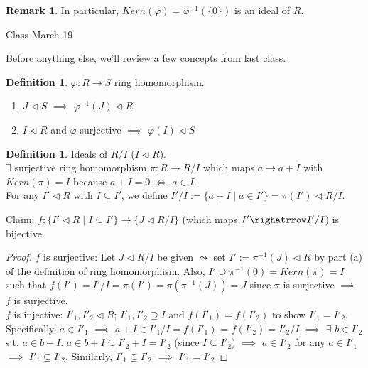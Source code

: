 \documentclass[11pt]{article}
\theoremstyle{definition}
\newtheorem{definition}[thm]{Definition}
\newtheorem{remark}[thm]{Remark}
\numberwithin{equation}{section}
\begin{document}
\begin{remark}
In particular, $Kern(\varphi) = \varphi^{-1}(\{0\})$ is an ideal of $R$.
\end{remark}

\begin{center}
{\sf\LARGE Class March 19}
\end{center}


Before anything else, we'll review a few concepts from last class.

\begin{definition}
$\varphi:R \rightarrow S$ ring homomorphism.
\begin{enumerate}
    \item $J \vartriangleleft S$ $\implies$ $\varphi^{-1}(J) \vartriangleleft R$
    \item $I \vartriangleleft R$ and $\varphi$ surjective $\implies$ $\varphi(I) \vartriangleleft S$
\end{enumerate}
\end{definition}

\begin{definition}
Ideals of $R/I$ ($I \vartriangleleft R$).\\
$\exists$ surjective ring homomorphism $\pi: R \rightarrow R/I$ which maps $a \rightarrow a + I$ with $Kern(\pi) = I$ because $a + I = 0$ $\Leftrightarrow$ $a \in I$.\\
For any $I' \vartriangleleft R$ with $I \subseteq I'$, we define $I'/I := \{a+I \mid a \in I'\} = \pi(I') \vartriangleleft R/I$.
\end{definition}

Claim: $f: \{I' \vartriangleleft R \mid I \subseteq I' \} \rightarrow \{J \vartriangleleft R/I\}$ (which maps $I' \righatrrow I'/I$) is bijective.\\
\begin{proof}
$f$ is surjective: Let $J \vartriangleleft R/I$ be given $\leadsto$ set $I':=\pi^{-1}(J) \vartriangleleft R$ by part (a) of the definition of ring homomorphism. Also, $I' \supseteq \pi^{-1}(0) = Kern(\pi) = I$ such that $f(I') = I'/I = \pi(I') = \pi(\pi^{-1}(J)) = J$ since $\pi$ is surjective $\implies$ $f$ is surjective.\\
$f$ is injective: $I'_{1}, I'_{2} \vartriangleleft R$; $I'_{1}, I'_{2} \supseteq I$ and $f(I'_{1}) = f(I'_{2})$ to show $I'_{1} = I'_{2}$. Specifically, $a \in I'_{1}$ $\implies$ $a + I \in I'_{1}/I = f(I'_{1})$ = $f(I'_{2}) = I'_{2}/I$ $\implies$ $\exists$ $b \in I'_{2}$ s.t. $a \in b + I$. $a \in b + I \subseteq I'_{2} + I = I'_{2}$ (since $I \subseteq I'_{2}$) $\implies$ $a \in I'_{2}$ for any $a \in I'_{1}$ $\implies$ $I'_{1} \subseteq I'_{2}$. Similarly, $I'_{1} \subseteq I'_{2}$ $\implies$ $I'_{1} = I'_{2}$
\end{proof}
\end{document}
